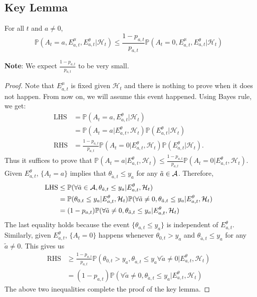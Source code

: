 \documentclass[11pt]{article}
\begin{document}
\subsection{Key Lemma}
\begin{lemma}
For all $t$ and $a \neq 0$, 
$$
    \mathbb{P}(A_t = a, E^\mu_{a, t}, E^\theta_{a, t} | \mathcal{H}_t) \leq \frac{1 - p_{a, t}}{p_{a, t}} \mathbb{P}(A_t = 0, E^\mu_{a, t}, E^\theta_{a, t} | \mathcal{H}_t)
$$
\end{lemma}

\noindent \textbf{Note}: We expect $\frac{1 - p_{a, t}}{p_{a, t}}$ to be very small. 

\begin{proof}
    Note that $E^\mu_{a, t}$ is fixed given $\mathcal{H}_t$ and there is nothing to prove when it does not happen. From now on, we will assume this event happened. Using Bayes rule, we get:
    \begin{align*}
        \text{LHS} &= \mathbb{P}(A_t = a, E^\theta_{a, t} | \mathcal{H}_t) \\
        &= \mathbb{P}(A_t = a | E^\theta_{a, t}, \mathcal{H}_t) \mathbb{P}(E^\theta_{a, t} | \mathcal{H}_t) \\
        \text{RHS} &= \frac{1 - p_{a, t}}{p_{a, t}} \mathbb{P}(A_t = 0| E^\theta_{a, t}, \mathcal{H}_t) \mathbb{P}(E^\theta_{a, t} | \mathcal{H}_t).
    \end{align*}
    Thus it suffices to prove that $\mathbb{P}(A_t = a | E^\theta_{a, t}, \mathcal{H}_t) \leq \frac{1 - p_{a, t}}{p_{a, t}} \mathbb{P}(A_t = 0| E^\theta_{a, t}, \mathcal{H}_t)$. 
    Given $E^\theta_{a, t}$, $\{A_t = a\}$ implies that $\theta_{\tilde{a}, t} \leq y_a$ for any $\tilde{a} \in \mathcal{A}$. Therefore, 
    \begin{align*}
        \text{LHS} &\leq \mathbb{P}(\forall \tilde{a}\in \mathcal{A}, \theta_{\tilde{a}, t} \leq y_a | E^\theta_{a, t}, \mathcal{H}_t) \\ 
        &= \mathbb{P}(\theta_{0, t} \leq y_a | E^\theta_{a, t}, \mathcal{H}_t)\mathbb{P}(\forall \tilde{a} \neq 0, \theta_{\tilde{a}, t} \leq y_a | E^\theta_{a, t}, \mathcal{H}_t) \\
        &= (1 - p_{a, t})\mathbb{P}(\forall \tilde{a} \neq 0, \theta_{\tilde{a}, t} \leq y_a | E^\theta_{a, t}, \mathcal{H}_t)
    \end{align*}
    The last equality holds because the event $\{\theta_{a, t} \leq y_a\}$ is independent of $E^\theta_{a, t}$. Similarly, given $E^\theta_{a, t}$, $\{A_t = 0\}$ happens whenever $\theta_{0, t} > y_a$ and $\theta_{\tilde{a}, t} \leq y_a$ for any $\tilde{a} \neq 0$. This gives us
    \begin{align*}
        \text{RHS} &\geq \frac{1 - p_{a, t}}{p_{a, t}} \mathbb{P}(\theta_{0, t} > y_a, \theta_{\tilde{a}, t} \leq y_a \forall \tilde{a} \neq 0 | E^\theta_{a, t}, \mathcal{H}_t) \\
        &= (1- p_{a, t}) \mathbb{P}(\forall \tilde{a} \neq 0, \theta_{\tilde{a}, t} \leq y_a | E^\theta_{a, t}, \mathcal{H}_t)
    \end{align*}
    The above two inequalities complete the proof of the key lemma.
\end{proof}
		
\end{document}
